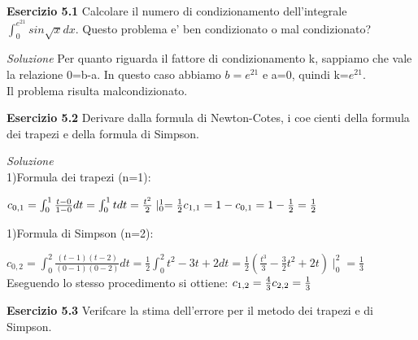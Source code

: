 \documentclass[20pt,a4paper]{book}
\begin{document}
  


\textbf{\Large{Esercizio 5.1}}  
Calcolare il numero di condizionamento dell'integrale \begin{math}\int_{0}^{e^{21}} sin \sqrt{x} dx\end{math}. Questo problema e' ben condizionato o mal condizionato? 
 
\textit{Soluzione}
Per quanto riguarda il fattore di condizionamento k, sappiamo che vale la relazione 0=b-a. In questo caso abbiamo \begin{math}b=e^{21}\end{math} e a=0, quindi k=\begin{math}e^{21}\end{math}.
\\Il problema risulta malcondizionato.

\vspace{10mm}

\textbf{\Large{Esercizio 5.2}}  
Derivare dalla formula di Newton-Cotes, i coecienti della formula dei trapezi e della formula di Simpson.
 
\textit{Soluzione}
\\1)Formula dei trapezi (n=1):

\begin{math} c_{0,1}=\int_{0}^{1}\frac{t-0}{1-0}dt=\int_{0}^{1}t dt=\frac{t^{2}}{2}\mid_{0}^{1}=\frac{1}{2} 
\\c_{1,1}=1-c_{0,1}=1-\frac{1}{2}=\frac{1}{2} \end{math}

\vspace{3mm}

1)Formula di Simpson (n=2):

\begin{math} c_{0,2}=\int_{0}^{2}\frac{(t-1)(t-2)}{(0-1)(0-2)}dt=\frac{1}{2}\int_{0}^{2}t^{2}-3t+2 dt=\frac{1}{2}(\frac{t^{3}}{3}-\frac{3}{2}t^{2}+2t)\mid_{0}^{2}=\frac{1}{3}\end{math}
\\Eseguendo lo stesso procedimento si ottiene: \begin{math}
\\c_{1,2}=\frac{4}{3}
\\c_{2,2}=\frac{1}{3}\end{math}


\vspace{10mm}

\textbf{\Large{Esercizio 5.3}}  
Verifcare la stima dell'errore per il metodo dei trapezi e di Simpson.
 
\end{document}
